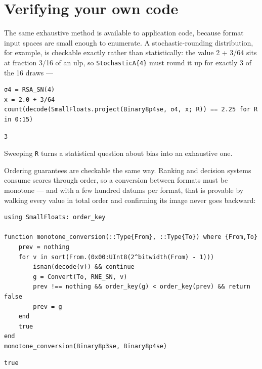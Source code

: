 \section{Verifying your own code}



\label{12572045495842974798}{}


The same exhaustive method is available to application code, because format input spaces are small enough to enumerate. A stochastic-rounding distribution, for example, is checkable exactly rather than statistically: the value 2 + 3/64 sits at fraction 3/16 of an ulp, so \texttt{StochasticA\{4\}} must round it up for exactly 3 of the 16 draws —




\begin{minipage}{\linewidth}
\begin{verbatim}
σ4 = RSA_SN(4)
x = 2.0 + 3/64
count(decode(SmallFloats.project(Binary8p4se, σ4, x; R)) == 2.25 for R in 0:15)
\end{verbatim}




\begin{verbatim}
3
\end{verbatim}
\end{minipage}




Sweeping \texttt{R} turns a statistical question about bias into an exhaustive one.



Ordering guarantees are checkable the same way. Ranking and decision systems consume scores through order, so a conversion between formats must be monotone — and with a few hundred datums per format, that is provable by walking every value in total order and confirming its image never goes backward:




\nopagebreak[4]
\begin{minipage}{\linewidth}
\begin{verbatim}
using SmallFloats: order_key

function monotone_conversion(::Type{From}, ::Type{To}) where {From,To}
    prev = nothing
    for v in sort(From.(0x00:UInt8(2^bitwidth(From) - 1)))
        isnan(decode(v)) && continue
        g = Convert(To, RNE_SN, v)
        prev !== nothing && order_key(g) < order_key(prev) && return false
        prev = g
    end
    true
end
monotone_conversion(Binary8p3se, Binary8p4se)
\end{verbatim}




\begin{verbatim}
true
\end{verbatim}
\end{minipage}




